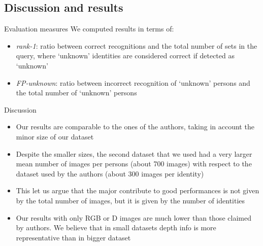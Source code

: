 \documentclass[unknownkeysallowed]{beamer}
\begin{document}
\subsection{Discussion and results}
\begin{frame}{Evaluation measures}
	We computed results in terms of:
	\begin{itemize}
		\item \textit{rank-1}: ratio between correct recognitions and
			the total number of sets in the query, where `unknown'
			identities are considered correct if detected as
			`unknown'
		\item \textit{FP-unknown}: ratio between incorrect recognition
			of `unknown' persons and the total number of `unknown'
			persons
	\end{itemize}
\end{frame}

\begin{frame}{Discussion}
	\begin{itemize}
		\item Our results are comparable to the ones of the authors,
			taking in account the minor size of our dataset
		\item Despite the smaller sizes, the second dataset that we
			used had a very larger mean number of images per
			persons (about 700 images) with respect to the dataset
			used by the authors (about 300 images per identity)
		\item This let us argue that the major contribute to good
			performances is not given by the total number of images,
			but it is given by the number of identities
		\item Our results with only RGB or D images are much lower than
			those claimed by authors. We believe that in small
			datasets depth info is more representative than in
			bigger dataset
	\end{itemize}
\end{frame}
\end{document}
